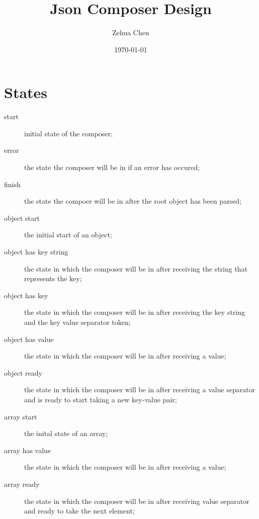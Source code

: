 \documentclass[11pt, letterpaper]{article}
\title{Json Composer Design}
\author{Zehua Chen}
\date{\today}
\begin{document}
  \maketitle
  
  \section{States}
  
    \begin{description}
      \item[start] initial state of the composer;
      \item[error] the state the composer will be in if an error has occured; 
      \item[finish] the state the compoer will be in after the root object has
      been parsed;  
      \item[object start] the initial start of an object;
      \item[object has key string] the state in which the composer will be in 
      after receiving the string that represents the key;
      \item[object has key] the state in which the composer will be in after 
      receiving the key string and the key value separator 
      token;
      \item[object has value] the state in which the composer will be in after
      receiving a value;
      \item[object ready] the state in which the composer will be in after 
      receiving a value separator and is ready to start 
      taking a new key-value pair; 
      \item[array start] the inital state of an array;
      \item[array has value] the state in which the composer will be in after 
      receiving a value;  
      \item[array ready] the state in which the composer will be in after 
      receiving value separator and ready to take the next element; 
    \end{description}
    
\end{document}

